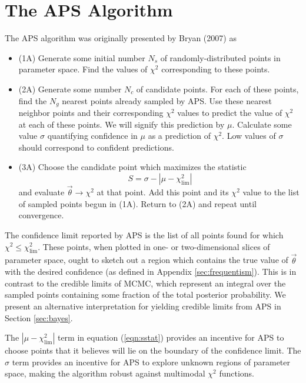 \documentclass[useAMS,usenatbib]{aastex}
\begin{document}
\section{The APS Algorithm}
\label{sec:algorithm}

The APS algorithm was originally presented by Bryan (2007) as

\begin{itemize}
\item(1A) Generate some initial number $N_s$ of randomly-distributed points in 
parameter space.  Find the values of $\chi^2$ corresponding to these points.
\\
\item(2A) Generate some number $N_c$ of candidate points.  
For each of these points, find the $N_g$ nearest points already sampled
by APS. Use these nearest neighbor points and their corresponding $\chi^2$ values
to predict the value of $\chi^2$ at each of these points.
 We will signify this prediction by $\mu$.  Calculate some value $\sigma$
 quantifying confidence in $\mu$ as a prediction of $\chi^2$.  Low values of
 $\sigma$ should correspond to confident predictions.
 \\
\item(3A) Choose the candidate point which maximizes the statistic
\begin{equation}
\label{eqn:sstat}
S=\sigma-|\mu-\chi^2_\text{lim}|
\end{equation}
and evaluate $\vec{\theta}\rightarrow\chi^2$ at that point.  Add this point and
its $\chi^2$ value to the list of sampled points begun in (1A). 
Return to (2A) and repeat until convergence.
\\
\end{itemize}
The confidence limit reported by APS is the list of all points found
for which $\chi^2\le\chi^2_\text{lim}$.  
These points, when plotted in one- or two-dimensional slices of parameter
space, ought to sketch out a region which contains the true value of $\vec{\theta}$
with the desired confidence (as defined in Appendix \ref{sec:frequentism}).
This is in contrast to the credible
limits of MCMC, which represent an integral over the sampled points containing some
fraction of the total posterior probability.  We present an alternative
interpretation for yielding credible limits from APS in Section \ref{sec:bayes}.

The $|\mu-\chi^2_\text{lim}|$ term in equation (\ref{eqn:sstat}) provides an
incentive for APS to choose points that it believes will lie on the boundary of
the confidence limit.  
The $\sigma$ term provides an incentive for APS to explore unknown regions of
parameter space, making the algorithm robust against multimodal $\chi^2$
functions.  
\end{document}
